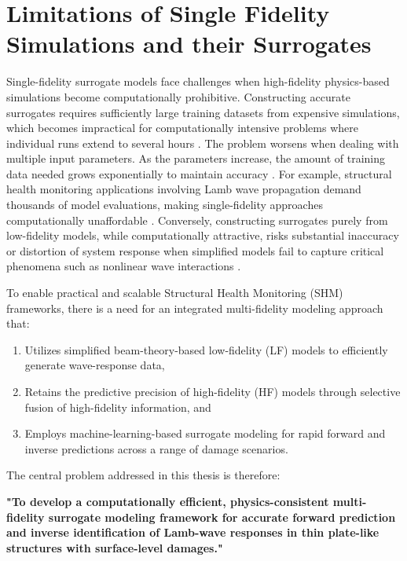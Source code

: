\documentclass[12pt,a4paper]{report}
\begin{document}
\section{Limitations of Single Fidelity Simulations and their Surrogates}
\label{Limitations of surrogates}

Single-fidelity surrogate models face challenges when high-fidelity physics-based simulations become computationally prohibitive. Constructing accurate surrogates requires sufficiently large training datasets from expensive simulations, which becomes impractical for computationally intensive problems where individual runs extend to several hours \citep{Giselle_Fern_ndez_Godino_2023} \citep{Wang2020}. The problem worsens when dealing with multiple input parameters. As the parameters increase, the amount of training data needed grows exponentially to maintain accuracy \citep{Jakeman2020}. For example, structural health monitoring applications involving Lamb wave propagation demand thousands of model evaluations, making single-fidelity approaches computationally unaffordable \citep{https://doi.org/10.1002/eqe.4116}. Conversely, constructing surrogates purely from low-fidelity models, while computationally attractive, risks substantial inaccuracy or distortion of system response when simplified models fail to capture critical phenomena such as nonlinear wave interactions \citep{ZHANG2022101430}.

To enable practical and scalable Structural Health Monitoring (SHM) frameworks, there is a need for an integrated multi-fidelity modeling approach that:
\begin{enumerate}
    \item Utilizes simplified beam-theory-based low-fidelity (LF) models to efficiently generate wave-response data,
    \item Retains the predictive precision of high-fidelity (HF) models through selective fusion of high-fidelity information, and
    \item Employs machine-learning-based surrogate modeling for rapid forward and inverse predictions across a range of damage scenarios.
\end{enumerate}

The central problem addressed in this thesis is therefore:

\medskip

\textbf{"To develop a computationally efficient, physics-consistent multi-fidelity surrogate modeling framework for accurate forward prediction and inverse identification of Lamb-wave responses in thin plate-like structures with surface-level damages."}
\end{document}
